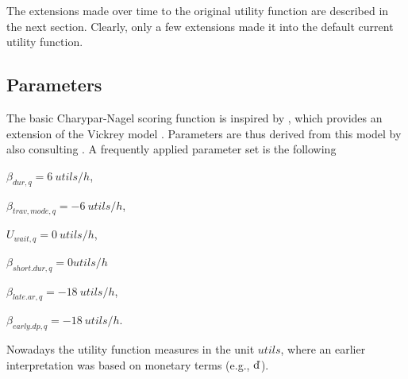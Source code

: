 The extensions made over time to the original utility function are described in the next section. Clearly, only a few extensions made it into the default current utility function.

\subsection{Parameters}
\label{sec:paramset}
The basic Charypar-Nagel scoring function is inspired by \citet[][]{ArnottEtAl_TAER_1993}, which provides an extension of the Vickrey model \citep[][]{Vickrey_TAER_1969}. Parameters are thus derived from this model by also consulting \citet[][]{ChaumetEtAl_2006}. A frequently applied parameter set is the following 
%
\begin{compactitem}
\item $\beta_{dur,q}= 6\ utils/h$,
\item $\beta_{trav, mode, q}= -6\ utils/h$,
\item $U_{wait,q}=0\ utils/h$,
\item $\beta_{short.dur,q} = 0 utils/h$
\item $\beta_{late.ar,q}=-18\ utils/h$,
\item $\beta_{early.dp,q}=-18\ utils/h$.
\end{compactitem}
%
Nowadays the utility function measures in the unit $utils$, where an earlier interpretation was based on monetary terms (e.g., $\EUR$).

%

